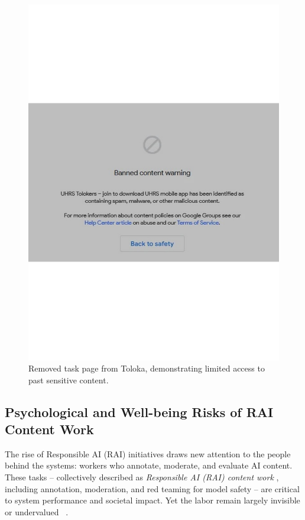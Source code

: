 \begin{figure}
  \centering
  \includegraphics[width=0.7\linewidth]{figures/toloka_removed_task.pdf}
  \caption{Removed task page from Toloka, demonstrating limited access to past sensitive content.}
  \label{fig:toloka_removed}
\end{figure}


\subsection{Psychological and Well-being Risks of RAI Content Work} 
The rise of Responsible AI (RAI) initiatives draws new attention to the people behind the systems: workers who annotate, moderate, and evaluate AI content. These tasks -- collectively described as \textit{Responsible AI (RAI) content work} \cite{qian2025aura}, including annotation, moderation, and red teaming for model safety -- are critical to system performance and societal impact. Yet the labor remain largely invisible or undervalued ~\cite{gray2019ghost}. 

